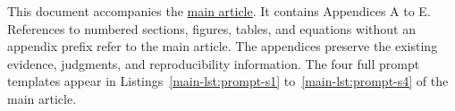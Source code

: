 \documentclass[systems,supfile,submit,moreauthors]{Definitions/mdpi}
\begin{document}
This document accompanies the \href{main.pdf}{main article}. It contains Appendices A to E. References to numbered sections, figures, tables, and equations without an appendix prefix refer to the main article. The appendices preserve the existing evidence, judgments, and reproducibility information. The four full prompt templates appear in Listings~\ref{main-lst:prompt-s1} to~\ref{main-lst:prompt-s4} of the main article.

\appendixstart
\appendix
{}

\end{document}
